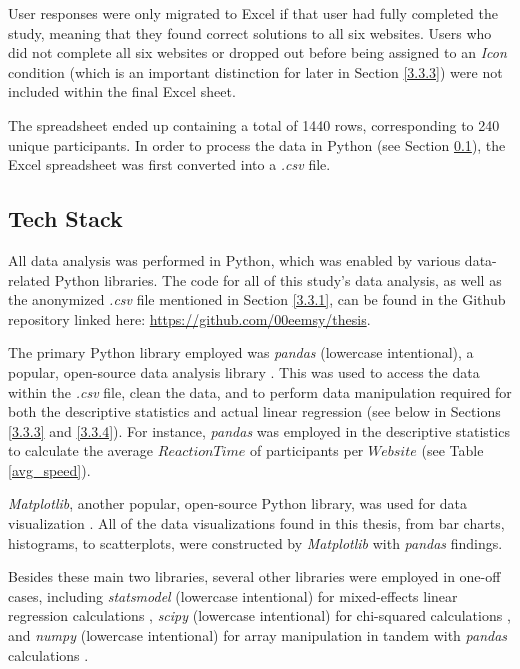 \documentclass[12pt,twoside]{reedthesis}
\begin{document}
        User responses were only migrated to Excel if that user had fully completed the study, meaning that they found correct solutions to all six websites. Users who did not complete all six websites or dropped out before being assigned to an \textit{Icon} condition (which is an important distinction for later in Section \ref{3.3.3}) were not included within the final Excel sheet.
        
        The spreadsheet ended up containing a total of 1440 rows, corresponding to 240 unique participants. In order to process the data in Python (see Section \ref{3.3.2}), the Excel spreadsheet was first converted into a \textit{.csv} file.

    \subsection{Tech Stack}\label{3.3.2}

        All data analysis was performed in Python, which was enabled by various data-related Python libraries. The code for all of this study's data analysis, as well as the anonymized \textit{.csv} file mentioned in Section \ref{3.3.1}, can be found in the Github repository linked here: \url{https://github.com/00eemsy/thesis}.
    
        The primary Python library employed was \textit{pandas} (lowercase intentional), a popular, open-source data analysis library \cite{pandas}. This was used to access the data within the \textit{.csv} file, clean the data, and to perform data manipulation required for both the descriptive statistics and actual linear regression (see below in Sections \ref{3.3.3} and \ref{3.3.4}). For instance, \textit{pandas} was employed in the descriptive statistics to calculate the average $ReactionTime$ of participants per $Website$ (see Table \ref{avg_speed}).
    
        \textit{Matplotlib}, another popular, open-source Python library, was used for data visualization \cite{matplotlib}. All of the data visualizations found in this thesis, from bar charts, histograms, to scatterplots, were constructed by \textit{Matplotlib} with \textit{pandas} findings. 
    
        Besides these main two libraries, several other libraries were employed in one-off cases, including \textit{statsmodel} (lowercase intentional) for mixed-effects linear regression calculations \cite{statsmodel_mixedlm}, \textit{scipy} (lowercase intentional) for chi-squared calculations \cite{scipy_chisquare}, and \textit{numpy} (lowercase intentional) for array manipulation in tandem with \textit{pandas} calculations \cite{numpy}.
\end{document}
